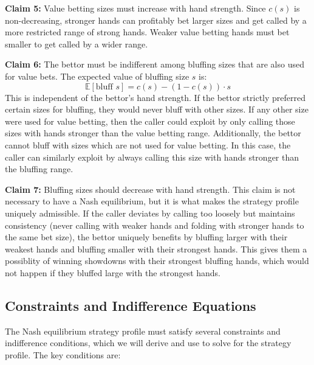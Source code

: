 \documentclass[../../main/main.tex]{subfiles}
\begin{document}
\begin{customproof}
    \textbf{Claim 5:} Value betting sizes must increase with hand strength.
    Since $c(s)$ is non-decreasing, stronger hands can profitably bet larger sizes and get called by a more restricted range of strong hands. Weaker value betting hands must bet smaller to get called by a wider range.

    \textbf{Claim 6:} The bettor must be indifferent among bluffing sizes that are also used for value bets.
    The expected value of bluffing size $s$ is:
    \begin{equation}
        \mathbb{E}[\text{bluff } s] = c(s) - (1-c(s)) \cdot s
    \end{equation}
    This is independent of the bettor's hand strength. If the bettor strictly preferred certain sizes for bluffing, they would never bluff with other sizes. If any other size were used for value betting, then the caller could exploit by only calling those sizes with hands stronger than the value betting range.
    Additionally, the bettor cannot bluff with sizes which are not used for value betting. In this case, the caller can similarly exploit by always calling this size with hands stronger than the bluffing range.

    \textbf{Claim 7:} Bluffing sizes should decrease with hand strength. This claim is not necessary to have a Nash equilibrium, but it is what makes the strategy profile uniquely admissible.
    If the caller deviates by calling too loosely but maintains consistency (never calling with weaker hands and folding with stronger hands to the same bet size), the bettor uniquely benefits by bluffing larger with their weakest hands and bluffing smaller with their strongest hands. This gives them a possiblity of winning showdowns with their strongest bluffing hands, which would not happen if they bluffed large with the strongest hands.
\end{customproof}



\subsection{Constraints and Indifference Equations}

The Nash equilibrium strategy profile must satisfy several constraints and indifference conditions, which we will derive and use to solve for the strategy profile. The key conditions are:
\end{document}
